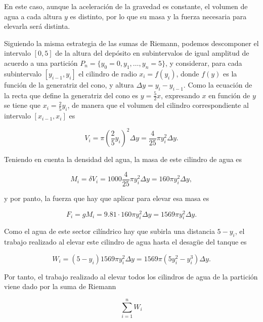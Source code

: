 \documentclass[
  spanish,
  a4paper,
]{scrreport}
\theoremstyle{definition}
\theoremstyle{remark}
\begin{document}
\begin{tcolorbox}[enhanced jigsaw, arc=.35mm, bottomrule=.15mm, bottomtitle=1mm, breakable, colback=white, colbacktitle=quarto-callout-tip-color!10!white, colframe=quarto-callout-tip-color-frame, coltitle=black, left=2mm, leftrule=.75mm, opacityback=0, opacitybacktitle=0.6, rightrule=.15mm, title=\textcolor{quarto-callout-tip-color}{\faLightbulb}\hspace{0.5em}{Solución}, titlerule=0mm, toprule=.15mm, toptitle=1mm]

En este caso, aunque la aceleración de la gravedad es constante, el
volumen de agua a cada altura \(y\) es distinto, por lo que su masa y la
fuerza necesaria para elevarla será distinta.

Siguiendo la misma estrategia de las sumas de Riemann, podemos
descomponer el intervalo \([0, 5]\) de la altura del depósito en
subintervalos de igual amplitud de acuerdo a una partición
\(P_n=\{y_0=0, y_1, \ldots, y_n=5\}\), y considerar, para cada
subintervalo \([y_{i-1}, y_i]\) el cilindro de radio \(x_i=f(y_i)\),
donde \(f(y)\) es la función de la generatriz del cono, y altura
\(\Delta y=y_i-y_{i-1}\). Como la ecuación de la recta que define la
generatriz del cono es \(y=\frac{5}{2}x\), expresando \(x\) en función
de \(y\) se tiene que \(x_i=\frac{2}{5}y_i\), de manera que el volumen
del cilindro correspondiente al intervalo \([x_{i-1},x_i]\) es

\[
V_i = \pi\left(\frac{2}{5}y_i\right)^2\Delta y = \frac{4}{25}\pi y_i^2 \Delta y.
\]

Teniendo en cuenta la densidad del agua, la masa de este cilindro de
agua es

\[
M_i = \delta V_i = 1000 \frac{4}{25}\pi y_i^2 \Delta y = 160\pi y_i^2 \Delta y,
\]

y por panto, la fuerza que hay que aplicar para elevar esa masa es

\[
F_i = g M_i = 9.81 \cdot 160 \pi y_i^2 \Delta y = 1569 \pi y_i^2 \Delta y.
\]

Como el agua de este sector cilíndrico hay que subirla una distancia
\(5-y_i\), el trabajo realizado al elevar este cilindro de agua hasta el
desagüe del tanque es

\[
W_i = (5-y_i)1569 \pi y_i^2 \Delta y = 1569 \pi( 5y_i^2-y_i^3) \Delta y.
\]

Por tanto, el trabajo realizado al elevar todos los cilindros de agua de
la partición viene dado por la suma de Riemann

\[
\sum_{i=1}^n W_i
\]


\end{tcolorbox}
\end{document}
